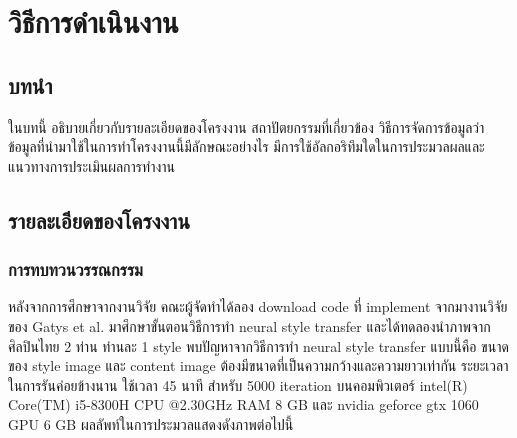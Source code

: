 \documentclass[12pt,oneside,openright,a4paper]{cpe-thai-project}
\begin{document}
\newpage





\chapter{วิธีการดำเนินงาน}
\section{บทนำ}
\par\setlength{\parindent}{5ex}
ในบทนี้ อธิบายเกี่ยวกับรายละเอียดของโครงงาน สถาปัตยกรรมที่เกี่ยวข้อง วิธีการจัดการข้อมูลว่า ข้อมูลที่นำมาใช้ในการทำโครงงานนี้มีลักษณะอย่างไร มีการใช้อัลกอริทึมใดในการประมวลผลและแนวทางการประเมินผลการทำงาน

\section{รายละเอียดของโครงงาน}

\subsection{การทบทวนวรรณกรรม}
\par\setlength{\parindent}{5ex} 
หลังจากการศึกษาจากงานวิจัย คณะผู้จัดทำได้ลอง download code ที่ implement จากมางานวิจัยของ Gatys et al. \cite{NeuralTr45:online} มาศึกษาขั้นตอนวิธีการทำ neural style transfer และได้ทดลองนำภาพจากศิลปินไทย 2 ท่าน ท่านละ 1 style พบปัญหาจากวิธีการทำ neural style transfer แบบนี้คือ ขนาดของ style image และ content image ต้องมีขนาดที่เป็นความกว้างและความยาวเท่ากัน ระยะเวลาในการรันค่อยข้างนาน ใช้เวลา 45 นาที สำหรับ 5000 iteration บนคอมพิวเตอร์ intel(R) Core(TM) i5-8300H CPU @2.30GHz RAM 8 GB และ nvidia geforce gtx 1060 GPU 6 GB ผลลัพท์ในการประมวลแสดงดังภาพต่อไปนี้
\end{document}
